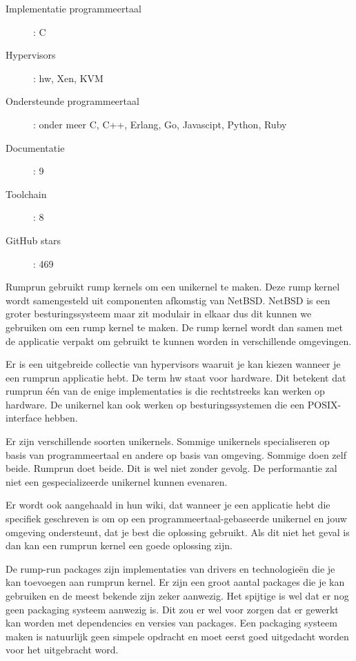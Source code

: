 \documentclass[pdftex,a4paper,12pt,twoside]{report}
\begin{document}
\begin{description}
  \item [Implementatie programmeertaal]: C
  \item [Hypervisors]: hw, Xen, KVM
  \item [Ondersteunde programmeertaal]: onder meer C, C++, Erlang, Go, Javascipt, Python, Ruby
  \item [Documentatie]: 9
  \item [Toolchain]: 8
  \item [GitHub stars]: 469
\end{description}

Rumprun gebruikt rump kernels om een unikernel te maken. Deze rump kernel wordt samengesteld uit componenten afkomstig van NetBSD. NetBSD is een groter besturingssysteem maar zit modulair in elkaar dus dit kunnen we gebruiken om een rump kernel te maken. De rump kernel wordt dan samen met de applicatie verpakt om gebruikt te kunnen worden in verschillende omgevingen.

Er is een uitgebreide collectie van hypervisors waaruit je kan kiezen wanneer je een rumprun applicatie hebt. De term hw staat voor hardware. Dit betekent dat rumprun één van de enige implementaties is die rechtstreeks kan werken op hardware. De unikernel kan ook werken op besturingssystemen die een POSIX-interface hebben.

Er zijn verschillende soorten unikernels. Sommige unikernels specialiseren op basis van programmeertaal en andere op basis van omgeving. Sommige doen zelf beide. Rumprun doet beide. Dit is wel niet zonder gevolg. De performantie zal niet een gespecializeerde unikernel kunnen evenaren.

Er wordt ook aangehaald in hun wiki, dat wanneer je een applicatie hebt die specifiek geschreven is om op een programmeertaal-gebaseerde unikernel en jouw omgeving ondersteunt, dat je best die oplossing gebruikt. Als dit niet het geval is dan kan een rumprun kernel een goede oplossing zijn.

De rump-run packages zijn implementaties van drivers en technologieën  die je kan toevoegen aan rumprun kernel. Er zijn een groot aantal packages die je kan gebruiken en de meest bekende zijn zeker aanwezig. Het spijtige is wel dat er nog geen packaging systeem aanwezig is. Dit zou er wel voor zorgen dat er gewerkt kan worden met dependencies en versies van packages. Een packaging systeem maken is natuurlijk geen simpele opdracht en moet eerst goed uitgedacht worden voor het uitgebracht word.
\end{document}
